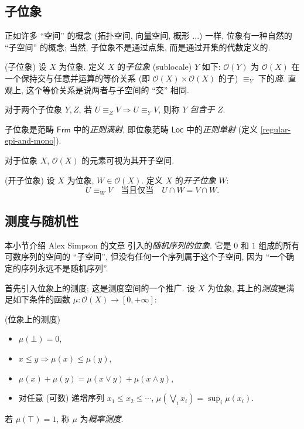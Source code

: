 \subsection{子位象}

正如许多 ``空间'' 的概念 (拓扑空间, 向量空间, 概形 ...) 一样, 位象有一种自然的 ``子空间'' 的概念; 当然, 子位象不是通过点集, 而是通过开集的代数定义的.

\begin{definition}
	{(子位象)}
	设 $X$ 为位象. 定义 $X$ 的\emph{子位象} (sublocale) $Y$ 如下: $\mathcal O(Y)$ 为 $\mathcal O(X)$ 在一个保持交与任意并运算的等价关系 (即 $\mathcal O(X)\times\mathcal O(X)$ 的子\fm{}) $\equiv_Y$ 下的\emph{商}. 直观上, 这个等价关系是说两者与子空间的 ``交'' 相同.
	
	对于两个子位象 $Y,Z$, 若 $U\equiv_Z V \Rightarrow U\equiv_Y V$, 则称 $Y$ \emph{包含于} $Z$.
\end{definition}

子位象是\fm{}范畴 $\mathsf {Frm}$ 中的\emph{正则满射}, 即位象范畴 $\mathsf {Loc}$ 中的\emph{正则单射} (定义 \ref{regular-epi-and-mono}).

对于位象 $X$, $\mathcal O(X)$ 的元素可视为其开子空间.

\begin{definition}
	{(开子位象)}
	设 $X$ 为位象, $W\in\mathcal O(X)$. 定义 $X$ 的\emph{开子位象} $W$:
	$$U \equiv_W V \quad \text{当且仅当} \quad U\cap W = V \cap W.$$
\end{definition}



\subsection{测度与随机性}

本小节介绍 Alex Simpson 的文章 \cite{SIMPSON20121642} 引入的\emph{随机序列的位象}. 它是 $0$ 和 $1$ 组成的所有可数序列的空间的 ``子空间'', 但没有任何一个序列属于这个子空间, 因为 ``一个确定的序列永远不是随机序列''.

首先引入位象上的测度; 这是测度空间的一个推广. 设 $X$ 为位象, 其上的\emph{测度}是满足如下条件的函数 $\mu\colon \mathcal O(X)\to [0,+\infty]$:

\begin{definition}
	{(位象上的测度)}
	\begin{itemize}
		\item $\mu(\bot) = 0$,
		\item $x\leq y \Rightarrow \mu(x)\leq \mu(y)$,
		\item $\mu(x)+\mu(y)=\mu(x\vee y)+\mu(x\wedge y)$,
		\item 对任意 (可数) 递增序列 $x_1\leq x_2\leq\cdots$, $\mu(\bigvee_i x_i)=\sup_{i}\mu(x_i)$.
	\end{itemize}
	若 $\mu(\top)=1$, 称 $\mu$ 为\emph{概率测度}.
\end{definition}

